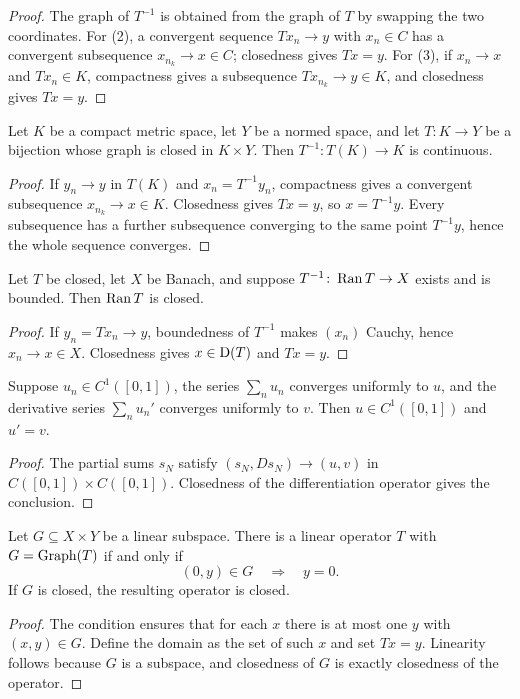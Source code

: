 \begin{proof}
The graph of $T^{-1}$ is obtained from the graph of $T$ by swapping the two
coordinates.  For (2), a convergent sequence $Tx_n\to y$ with $x_n\in C$
has a convergent subsequence $x_{n_k}\to x\in C$; closedness gives $Tx=y$.
For (3), if $x_n\to x$ and $Tx_n\in K$, compactness gives a subsequence
$Tx_{n_k}\to y\in K$, and closedness gives $Tx=y$.
\end{proof}

\begin{notetheorem}
Let $K$ be a compact metric space, let $Y$ be a normed space, and let
$T\colon K\to Y$ be a bijection whose graph is closed in $K\times Y$.
Then $T^{-1}\colon T(K)\to K$ is continuous.
\end{notetheorem}

\begin{proof}
If $y_n\to y$ in $T(K)$ and $x_n=T^{-1}y_n$, compactness gives a
convergent subsequence $x_{n_k}\to x\in K$.  Closedness gives $Tx=y$, so
$x=T^{-1}y$.  Every subsequence has a further subsequence converging to the
same point $T^{-1}y$, hence the whole sequence converges.
\end{proof}

\begin{notetheorem}
Let $T$ be closed, let $X$ be Banach, and suppose
$T^{-1}\colon\operatorname{Ran} T\to X$ exists and is bounded.  Then $\operatorname{Ran} T$ is closed.
\end{notetheorem}

\begin{proof}
If $y_n=Tx_n\to y$, boundedness of $T^{-1}$ makes $(x_n)$ Cauchy, hence
$x_n\to x\in X$.  Closedness gives $x\in\operatorname{D}(T)$ and $Tx=y$.
\end{proof}

\begin{notetheorem}
Suppose $u_n\in C^1([0,1])$, the series $\sum_nu_n$ converges uniformly to
$u$, and the derivative series $\sum_nu_n'$ converges uniformly to $v$.
Then $u\in C^1([0,1])$ and $u'=v$.
\end{notetheorem}

\begin{proof}
The partial sums $s_N$ satisfy
$(s_N,Ds_N)\to(u,v)$ in $C([0,1])\times C([0,1])$.  Closedness of the
differentiation operator gives the conclusion.
\end{proof}

\begin{notetheorem}
Let $G\subseteq X\times Y$ be a linear subspace.  There is a linear operator
$T$ with $G=\operatorname{Graph}(T)$ if and only if
\[
  (0,y)\in G\quad\Longrightarrow\quad y=0.
\]
If $G$ is closed, the resulting operator is closed.
\end{notetheorem}

\begin{proof}
The condition ensures that for each $x$ there is at most one $y$ with
$(x,y)\in G$.  Define the domain as the set of such $x$ and set $Tx=y$.
Linearity follows because $G$ is a subspace, and closedness of $G$ is exactly
closedness of the operator.
\end{proof}
